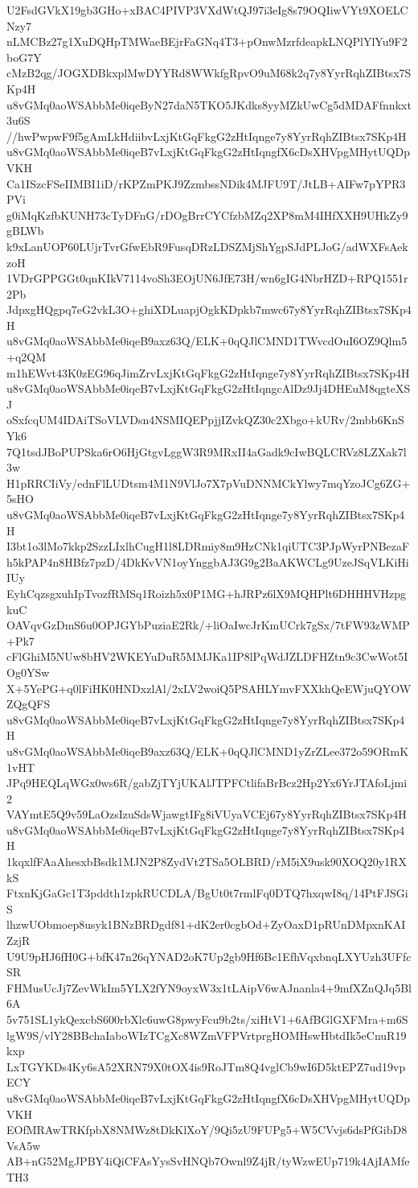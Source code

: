 U2FsdGVkX19gb3GHo+xBAC4PIVP3VXdWtQJ97i3eIg8s79OQIiwVYt9XOELCNzy7
nLMCBz27g1XuDQHpTMWaeBEjrFaGNq4T3+pOnwMzrfdeapkLNQPlYlYu9F2boG7Y
cMzB2qg/JOGXDBkxplMwDYYRd8WWkfgRpvO9uM68k2q7y8YyrRqhZIBtsx7SKp4H
u8vGMq0aoWSAbbMe0iqeByN27daN5TKO5JKdks8yyMZkUwCg5dMDAFfnnkxt3u6S
//hwPwpwF9f5gAmLkHdiibvLxjKtGqFkgG2zHtIqnge7y8YyrRqhZIBtsx7SKp4H
u8vGMq0aoWSAbbMe0iqeB7vLxjKtGqFkgG2zHtIqngfX6cDsXHVpgMHytUQDpVKH
Ca1ISzcFSeIIMBI1iD/rKPZmPKJ9ZzmbssNDik4MJFU9T/JtLB+AIFw7pYPR3PVi
g0iMqKzfbKUNH73cTyDFnG/rDOgBrrCYCfzbMZq2XP8mM4IHfXXH9UHkZy9gBLWb
k9xLanUOP60LUjrTvrGfwEbR9FusqDRzLDSZMjShYgpSJdPLJoG/adWXFsAekzoH
1VDrGPPGGt0qnKIkV7114voSh3EOjUN6JfE73H/wn6gIG4NbrHZD+RPQ1551r2Pb
JdpxgHQgpq7eG2vkL3O+ghiXDLuapjOgkKDpkb7mwc67y8YyrRqhZIBtsx7SKp4H
u8vGMq0aoWSAbbMe0iqeB9axz63Q/ELK+0qQJlCMND1TWvcdOuI6OZ9Qlm5+q2QM
m1hEWvt43K0zEG96qJimZrvLxjKtGqFkgG2zHtIqnge7y8YyrRqhZIBtsx7SKp4H
u8vGMq0aoWSAbbMe0iqeB7vLxjKtGqFkgG2zHtIqngcAlDz9Jj4DHEuM8qgteXSJ
oSxfcqUM4IDAiTSoVLVDsn4NSMIQEPpjjIZvkQZ30c2Xbgo+kURv/2mbb6KnSYk6
7Q1tsdJBoPUPSka6rO6HjGtgvLggW3R9MRxII4aGadk9cIwBQLCRVz8LZXak7l3w
H1pRRCIiVy/ednFlLUDtsm4M1N9VlJo7X7pVuDNNMCkYlwy7mqYzoJCg6ZG+5sHO
u8vGMq0aoWSAbbMe0iqeB7vLxjKtGqFkgG2zHtIqnge7y8YyrRqhZIBtsx7SKp4H
I3bt1o3lMo7kkp2SzzLIxlhCugH1l8LDRmiy8m9HzCNk1qiUTC3PJpWyrPNBezaF
h5kPAP4n8HBfz7pzD/4DkKvVN1oyYnggbAJ3G9g2BaAKWCLg9UzeJSqVLKiHiIUy
EyhCqzsgxuhIpTvozfRMSq1Roizh5x0P1MG+hJRPz6lX9MQHPlt6DHHHVHzpgkuC
OAVqvGzDmS6u0OPJGYbPuziaE2Rk/+liOaIwcJrKmUCrk7gSx/7tFW93zWMP+Pk7
cFlGhiM5NUw8bHV2WKEYuDuR5MMJKa1IP8lPqWdJZLDFHZtn9c3CwWot5IOg0YSw
X+5YePG+q0lFiHK0HNDxzlAl/2xLV2woiQ5PSAHLYmvFXXkhQeEWjuQYOWZQgQFS
u8vGMq0aoWSAbbMe0iqeB7vLxjKtGqFkgG2zHtIqnge7y8YyrRqhZIBtsx7SKp4H
u8vGMq0aoWSAbbMe0iqeB9axz63Q/ELK+0qQJlCMND1yZrZLee372o59ORmK1vHT
JPq9HEQLqWGx0ws6R/gabZjTYjUKAlJTPFCtlifaBrBcz2Hp2Yx6YrJTAfoLjmi2
VAYmtE5Q9v59LaOzsIzuSdsWjawgtIFg8iVUyaVCEj67y8YyrRqhZIBtsx7SKp4H
u8vGMq0aoWSAbbMe0iqeB7vLxjKtGqFkgG2zHtIqnge7y8YyrRqhZIBtsx7SKp4H
1kqxlfFAaAhesxbBsdk1MJN2P8ZydVt2TSa5OLBRD/rM5iX9usk90XOQ20y1RXkS
FtxnKjGaGc1T3pddth1zpkRUCDLA/BgUt0t7rmlFq0DTQ7hxqwI8q/14PtFJSGiS
lhzwUObmoep8usyk1BNzBRDgdf81+dK2er0cgbOd+ZyOaxD1pRUnDMpxnKAIZzjR
U9U9pHJ6fH0G+bfK47n26qYNAD2oK7Up2gb9Hf6Bc1EfhVqxbnqLXYUzh3UFfcSR
FHMusUcJj7ZevWkIm5YLX2fYN9oyxW3x1tLAipV6wAJnanla4+9mfXZnQJq5Bl6A
5v751SL1ykQexcbS600rbXlc6uwG8pwyFcu9b2ts/xiHtV1+6AfBGlGXFMra+m6S
lgW9S/vlY28BBchaIaboWIzTCgXc8WZmVFPVrtprgHOMHswHbtdIk5eCnuR19kxp
LxTGYKDs4Ky6sA52XRN79X0tOX4is9RoJTm8Q4vglCb9wI6D5ktEPZ7ud19vpECY
u8vGMq0aoWSAbbMe0iqeB7vLxjKtGqFkgG2zHtIqngfX6cDsXHVpgMHytUQDpVKH
EOfMRAwTRKfpbX8NMWz8tDkKlXoY/9Qi5zU9FUPg5+W5CVvjs6dsPfGibD8VsA5w
AB+nG52MgJPBY4iQiCFAsYysSvHNQb7Ownl9Z4jR/tyWzwEUp719k4AjIAMfeTH3
